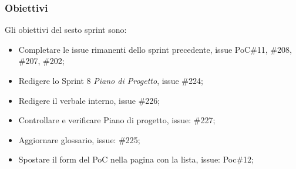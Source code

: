 \subsubsection{Obiettivi}
\label{sec:sprint8_obiettivi}
Gli obiettivi del sesto sprint sono:
\begin{itemize}
    \item Completare le issue rimanenti dello sprint precedente, issue PoC\#11, \#208, \#207, \#202;
    \item Redigere lo Sprint 8 \textit{Piano di Progetto}, issue \#224;
    \item Redigere il verbale interno, issue \#226;
    \item Controllare e verificare Piano di progetto, issue: \#227;
    \item Aggiornare glossario, issue: \#225;
    \item Spostare il form del PoC nella pagina con la lista, issue: Poc\#12;
\end{itemize}